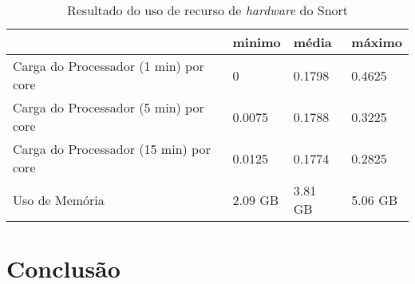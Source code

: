 \begin{table}[htb]
\ABNTEXfontereduzida
\centering
\caption{Resultado do uso de recurso de \textit{hardware} do Snort}
\label{tab:snort-recursos}
\begin{tabular}{|M{5cm}|M{2cm}|M{2cm}|M{2cm}|}
    \hline
     & \textbf{minimo} & \textbf{média} & \textbf{máximo} \\
    \hline
    Carga do Processador (1 min) por core & 0 & 0.1798 & 0.4625 \\
    \hline
    Carga do Processador (5 min) por core & 0.0075 & 0.1788 & 0.3225 \\
    \hline
    Carga do Processador (15 min) por core & 0.0125 & 0.1774 & 0.2825 \\
    \hline
    Uso de Memória & 2.09 GB & 3.81 GB & 5.06 GB \\
    \hline
\end{tabular}
\end{table}

\section{Conclusão} \label{sec:conclusão}
